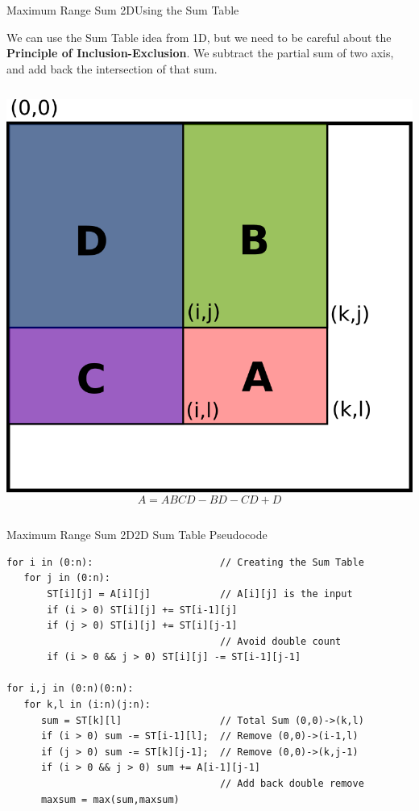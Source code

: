 \begin{frame}[fragile]{Maximum Range Sum 2D}{Using the Sum Table}

We can use the Sum Table idea from 1D, but we need to be careful about the {\bf Principle of Inclusion-Exclusion}. We subtract the partial sum of two axis, and add back the intersection of that sum.
\bigskip

\begin{columns}
  \includegraphics[width=\textwidth]{img/inclusion_exclusion}
  \[A = ABCD - BD - CD + D\]
\end{columns}

\end{frame}

\begin{frame}[fragile]{Maximum Range Sum 2D}{2D Sum Table Pseudocode}
\begin{block}{}
{\smaller
\begin{verbatim}
for i in (0:n):                      // Creating the Sum Table
   for j in (0:n):
       ST[i][j] = A[i][j]            // A[i][j] is the input
       if (i > 0) ST[i][j] += ST[i-1][j]
       if (j > 0) ST[i][j] += ST[i][j-1]
                                     // Avoid double count
       if (i > 0 && j > 0) ST[i][j] -= ST[i-1][j-1]

for i,j in (0:n)(0:n):
   for k,l in (i:n)(j:n):
      sum = ST[k][l]                 // Total Sum (0,0)->(k,l)
      if (i > 0) sum -= ST[i-1][l];  // Remove (0,0)->(i-1,l)
      if (j > 0) sum -= ST[k][j-1];  // Remove (0,0)->(k,j-1)
      if (i > 0 && j > 0) sum += A[i-1][j-1]
                                     // Add back double remove
      maxsum = max(sum,maxsum)
\end{verbatim}
}
\end{block}

\end{frame}

